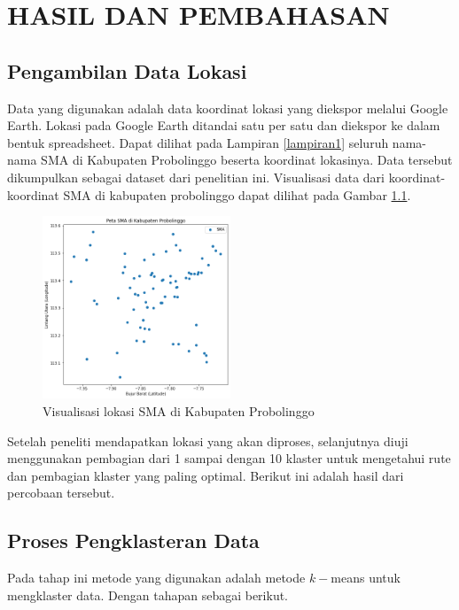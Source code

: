 \chapter{HASIL DAN PEMBAHASAN}

\section{Pengambilan Data Lokasi}

Data yang digunakan adalah data koordinat lokasi yang diekspor melalui Google Earth. Lokasi pada Google Earth ditandai satu per satu dan diekspor ke dalam bentuk spreadsheet. Dapat dilihat pada Lampiran \ref{lampiran1} seluruh nama-nama SMA di Kabupaten Probolinggo beserta koordinat lokasinya. Data tersebut dikumpulkan sebagai dataset dari penelitian ini. Visualisasi data dari koordinat-koordinat SMA di kabupaten probolinggo dapat dilihat pada Gambar \ref{fig:petasma}.

\begin{figure}[H]
  \centering
  \includegraphics[width=0.5\textwidth]{Gambar/peta sma.png}
  \caption{Visualisasi lokasi SMA di Kabupaten Probolinggo}
  \label{fig:petasma}
\end{figure}

Setelah peneliti mendapatkan lokasi yang akan diproses, selanjutnya diuji menggunakan pembagian dari 1 sampai dengan 10 klaster untuk mengetahui rute dan pembagian klaster yang paling optimal. Berikut ini adalah hasil dari percobaan tersebut.

\section{Proses Pengklasteran Data}

Pada tahap ini metode yang digunakan adalah metode $k-$means untuk mengklaster data. Dengan tahapan sebagai berikut.

